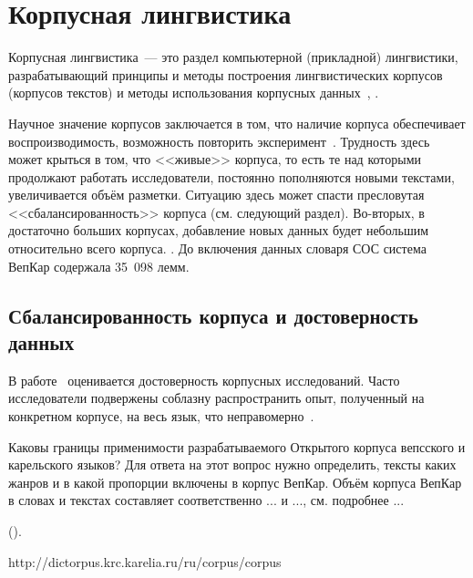 \section{Корпусная лингвистика} \label{sect_review_corpus_linguistics}

Корпусная лингвистика~--- это раздел компьютерной (прикладной) лингвистики, разрабатывающий принципы и методы  
построения лингвистических корпусов (корпусов текстов)
и методы использования корпусных данных~\cite[с.~3]{Zakharov2005}, \cite[с.~407]{Kibrik2019}.

Научное значение корпусов заключается в том, что наличие корпуса обеспечивает воспроизводимость, возможность повторить эксперимент~\cite[с.~409]{Kibrik2019}. Трудность здесь может крыться в том, что <<живые>> корпуса, то есть те над которыми продолжают работать исследователи, постоянно пополняются новыми текстами, увеличивается объём разметки. Ситуацию здесь может спасти пресловутая <<сбалансированность>> корпуса (см. следующий раздел). 
Во-вторых, в достаточно больших корпусах, добавление новых данных будет небольшим относительно всего корпуса. .
До включения данных словаря СОС система ВепКар содержала 35~098 лемм.

\subsection{Сбалансированность корпуса и достоверность данных}

В работе~\cite{Belikov2013}
оценивается достоверность корпусных исследований. 
Часто исследователи подвержены соблазну распространить опыт, полученный на конкретном корпусе, 
на весь язык, что неправомерно~\cite{Belikov2013}.

Каковы границы применимости разрабатываемого Открытого корпуса вепсского и карельского языков? 
Для ответа на этот вопрос нужно определить, тексты каких жанров и в какой пропорции включены в корпус ВепКар. 
Объём корпуса ВепКар в словах и текстах составляет соответственно ... и ..., см. подробнее ... 

().


http://dictorpus.krc.karelia.ru/ru/corpus/corpus

